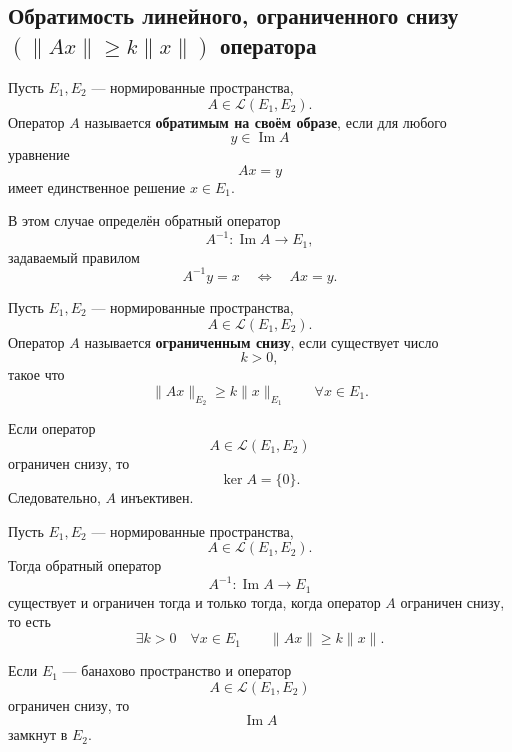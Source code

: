 \subsection{Обратимость линейного, ограниченного снизу \texorpdfstring{\((\|Ax\|\geqslant k\|x\|)\)}{(||Ax|| >= k||x||)} оператора}

\begin{definition}
	Пусть \(E_1,E_2\) --- нормированные пространства,
	\[
	A\in\mathcal{L}(E_1,E_2).
	\]
	Оператор \(A\) называется \textbf{обратимым на своём образе}, если для любого
	\[
	y\in \operatorname{Im}A
	\]
	уравнение
	\[
	Ax=y
	\]
	имеет единственное решение \(x\in E_1\).
	
	В этом случае определён обратный оператор
	\[
	A^{-1}:\operatorname{Im}A\to E_1,
	\]
	задаваемый правилом
	\[
	A^{-1}y=x
	\quad\Longleftrightarrow\quad
	Ax=y.
	\]
\end{definition}

\begin{definition}
	Пусть \(E_1,E_2\) --- нормированные пространства,
	\[
	A\in\mathcal{L}(E_1,E_2).
	\]
	Оператор \(A\) называется \textbf{ограниченным снизу}, если существует число
	\[
	k>0,
	\]
	такое что
	\[
	\|Ax\|_{E_2}\geqslant k\|x\|_{E_1}
	\qquad
	\forall x\in E_1.
	\]
\end{definition}

\begin{lemma}
	Если оператор
	\[
	A\in\mathcal{L}(E_1,E_2)
	\]
	ограничен снизу, то
	\[
	\ker A=\{0\}.
	\]
	Следовательно, \(A\) инъективен.
\end{lemma}

\begin{theorem}
	Пусть \(E_1,E_2\) --- нормированные пространства,
	\[
	A\in\mathcal{L}(E_1,E_2).
	\]
	Тогда обратный оператор
	\[
	A^{-1}:\operatorname{Im}A\to E_1
	\]
	существует и ограничен тогда и только тогда, когда оператор \(A\) ограничен снизу, то есть
	\[
	\exists k>0
	\quad
	\forall x\in E_1
	\qquad
	\|Ax\|\geqslant k\|x\|.
	\]
\end{theorem}


\begin{remark}
	Если \(E_1\) --- банахово пространство и оператор
	\[
	A\in\mathcal{L}(E_1,E_2)
	\]
	ограничен снизу, то
	\[
	\operatorname{Im}A
	\]
	замкнут в \(E_2\).
	
\end{remark}
